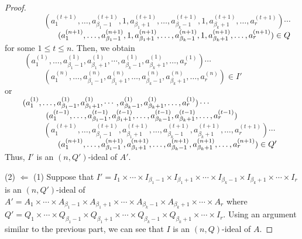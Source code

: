\documentclass[preprint,review,10pt]{amsart}
\theoremstyle{definition}
\theoremstyle{remark}
\numberwithin{equation}{section}
\begin{document}
\begin{proof}
$\hspace{2cm}(a^{(t+1)}_1,\ldots,a^{(t+1)}_{\beta_1-1},1, a^{(t+1)}_{\beta_1+1},\ldots, a^{(t+1)}_{\beta_k-1},1, a^{(t+1)}_{\beta_k+1},\ldots,a_r^{(t+1)}) \cdots$\\

$\hspace{2.25cm}(a^{(n+1)}_1,\ldots,a^{(n+1)}_{\beta_1-1},1, a^{(n+1)}_{\beta_1+1},\ldots, a^{(n+1)}_{\beta_k-1},1, a^{(n+1)}_{\beta_k+1},\ldots,a_r^{(n+1)}) \in Q$\\

for some $1 \leq t \leq n$. Then, we obtain \\

$\hspace{1cm} (a^{(1)}_1,\ldots,a^{(1)}_{\beta_1-1},  a^{(1)}_{\beta_1+1},\cdots, a^{(1)}_{\beta_k-1}, a^{(1)}_{\beta_k+1}, \dots,a_r^{(1)})\cdots$\\

$\hspace{2cm}(a^{(n)}_1,\ldots,a^{(n)}_{\beta_1-1},  a^{(n)}_{\beta_1+1},\ldots, a^{(n)}_{\beta_k-1},  a^{(n)}_{\beta_k+1},\ldots,a_r^{(n)}) \in I'$\\

or\\

$\hspace{0.75cm} (a^{(1)}_1,\ldots,a^{(1)}_{\beta_1-1},   a^{(1)}_{\beta_1+1},\cdots, a^{(1)}_{\beta_k-1},  a^{(1)}_{\beta_k+1}, \dots,a_r^{(1)})\cdots$\\

$\hspace{1.75cm}(a^{(t-1)}_1,\ldots,a^{(t-1)}_{\beta_1-1},  a^{(t-1)}_{\beta_1+1},\ldots, a^{(t-1)}_{\beta_k-1},  a^{(t-1)}_{\beta_k+1},\ldots,a_r^{(t-1)}) $\\

$\hspace{2cm}(a^{(t+1)}_1,\ldots,a^{(t+1)}_{\beta_1-1},  a^{(t+1)}_{\beta_1+1},\ldots, a^{(t+1)}_{\beta_k-1},  a^{(t+1)}_{\beta_k+1},\ldots,a_r^{(t+1)}) \cdots$\\

$\hspace{2.25cm}(a^{(n+1)}_1,\ldots,a^{(n+1)}_{\beta_1-1},  a^{(n+1)}_{\beta_1+1},\ldots, a^{(n+1)}_{\beta_k-1},  a^{(n+1)}_{\beta_k+1},\ldots,a_r^{(n+1)}) \in Q'$\\
Thus, $I'$ is an $(n,Q')$-ideal of $A'$.

(2) $\Longleftarrow$ (1)   Suppose that $I'  = I_1 \times \cdots \times I_{\beta_1-1} \times I_{\beta_1+1} \times \cdots \times I_{\beta_k-1} \times I_{\beta_k+1} \times \cdots \times I_r$ is an $(n,Q')$-ideal of $A' =A_1 \times \cdots \times A_{\beta_1-1} \times A_{\beta_1+1} \times \cdots \times A_{\beta_k-1} \times A_{\beta_k+1} \times \cdots \times A_r$ where $Q'=Q_1 \times \cdots \times Q_{\beta_1-1} \times Q_{\beta_1+1} \times \cdots \times Q_{\beta_k-1} \times Q_{\beta_k+1} \times \cdots \times I_r$. Using an argument similar to the previous part, we  can   see  that $I$ is an $(n,Q)$-ideal of $A$.
\end{proof}
\end{document}
